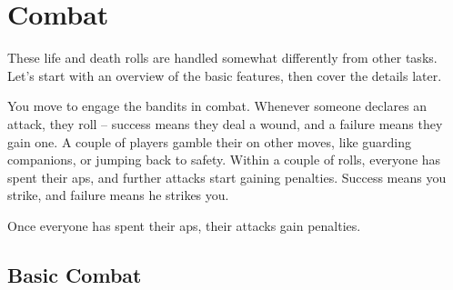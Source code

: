\chapter[The Arena]{Combat}
\label{combat}


\begin{multicols}{2}

\noindent
These life and death rolls are handled somewhat differently from other tasks.
Let's start with an overview of the basic features, then cover the details later.

\begin{exampletext}
  You move to engage the bandits in combat.
  Whenever someone declares an attack, they roll -- success means they deal a wound, and a failure means they gain one.
  A couple of players gamble their  on other moves, like guarding companions, or jumping back to safety.
  Within a couple of rolls, everyone has spent their \glspl{ap}, and further attacks start gaining penalties.
  Success means you strike, and failure means he strikes you.

  Once everyone has spent their \glspl{ap}, their attacks gain penalties.
\end{exampletext}

\end{multicols}

\section{Basic Combat}

